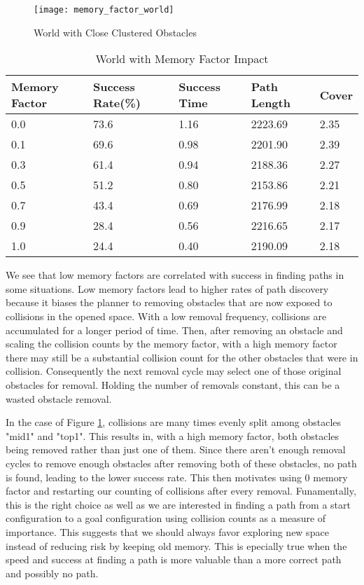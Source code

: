 \begin{figure}[h!]
    \centering
    \texttt{[image: memory\_factor\_world]}
    \caption{World with Close Clustered Obstacles}
    \label{fig:memory_factor_world}
\end{figure}

\begin{table}[h!]
\begin{tabular}{@{}lllll@{}}
\toprule
Memory Factor & Success Rate(\%)  & Success Time & Path Length & Cover \\ 
\midrule
0.0 & 73.6 & 1.16 & 2223.69 & 2.35 \\
0.1 & 69.6 & 0.98 & 2201.90 & 2.39 \\
0.3 & 61.4 & 0.94 & 2188.36 & 2.27 \\
0.5 & 51.2 & 0.80 & 2153.86 & 2.21 \\
0.7 & 43.4 & 0.69 & 2176.99 & 2.18 \\
0.9 & 28.4 & 0.56 & 2216.65 & 2.17 \\ 
1.0 & 24.4 & 0.40 & 2190.09 & 2.18 \\
\bottomrule
\end{tabular}
\caption{World with Memory Factor Impact}
\label{tab:memory_factor_impact}
\end{table}

We see that low memory factors are correlated with success in finding paths in some situations. Low memory factors lead to higher rates of path discovery because it biases the planner to removing obstacles that are now exposed to collisions in the opened space. With a low removal frequency, collisions are accumulated for a longer period of time. Then, after removing an obstacle and scaling the collision counts by the memory factor, with a high memory factor there may still be a substantial collision count for the other obstacles that were in collision. Consequently the next removal cycle may select one of those original obstacles for removal. Holding the number of removals constant, this can be a wasted obstacle removal. 

In the case of Figure \ref{fig:memory_factor_world}, collisions are many times evenly split among obstacles "mid1" and "top1". This results in, with a high memory factor, both obstacles being removed rather than just one of them. Since there aren't enough removal cycles to remove enough obstacles after removing both of these obstacles, no path is found, leading to the lower success rate. This then motivates using 0 memory factor and restarting our counting of collisions after every removal. Funamentally, this is the right choice as well as we are interested in finding a path from a start configuration to a goal configuration using collision counts as a measure of importance. This suggests that we should always favor exploring new space instead of reducing risk by keeping old memory. This is epecially true when the speed and success at finding a path is more valuable than a more correct path and possibly no path.


